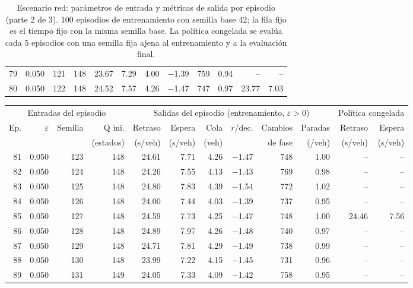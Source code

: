 \begin{table}[H]
\begin{tabular}{rrrrrrrrrrrr}
79 & 0.050 & 121 & 148 & 23.67 & 7.29 & 4.00 & $-$1.39 & 759 & 0.94 & -- & -- \\
80 & 0.050 & 122 & 148 & 24.52 & 7.57 & 4.26 & $-$1.47 & 747 & 0.97 & 23.77 & 7.03 \\
\bottomrule
\end{tabular}
\caption[Escenario red: episodios de entrenamiento (parte 2 de 3)]{Escenario red: parámetros de entrada y métricas de salida por episodio (parte 2 de 3). 100 episodios de entrenamiento con semilla base 42; la fila fijo es el tiempo fijo con la misma semilla base. La política congelada se evalúa cada 5 episodios con una semilla fija ajena al entrenamiento y a la evaluación final.}
\label{tab:red-episodios-2}
\end{table}

\begin{table}[H]
\centering
\scriptsize
\setlength{\tabcolsep}{3pt}
\begin{tabular}{rrrrrrrrrrrr}
\toprule
\multicolumn{4}{c}{Entradas del episodio} & \multicolumn{6}{c}{Salidas del episodio (entrenamiento, $\varepsilon>0$)} & \multicolumn{2}{c}{Política congelada} \\
\cmidrule(lr){1-4}\cmidrule(lr){5-10}\cmidrule(lr){11-12}
Ep. & $\varepsilon$ & Semilla & Q ini. & Retraso & Espera & Cola & $r$/dec. & Cambios & Paradas & Retraso & Espera \\
 &  &  & (estados) & (s/veh) & (s/veh) & (veh) &  & de fase & (/veh) & (s/veh) & (s/veh) \\
\midrule
81 & 0.050 & 123 & 148 & 24.61 & 7.71 & 4.26 & $-$1.47 & 748 & 1.00 & -- & -- \\
82 & 0.050 & 124 & 148 & 24.26 & 7.55 & 4.13 & $-$1.43 & 769 & 0.98 & -- & -- \\
83 & 0.050 & 125 & 148 & 24.80 & 7.83 & 4.39 & $-$1.54 & 772 & 1.02 & -- & -- \\
84 & 0.050 & 126 & 148 & 24.00 & 7.44 & 4.03 & $-$1.39 & 737 & 0.95 & -- & -- \\
85 & 0.050 & 127 & 148 & 24.59 & 7.73 & 4.25 & $-$1.47 & 748 & 1.00 & 24.46 & 7.56 \\
86 & 0.050 & 128 & 148 & 24.89 & 7.97 & 4.26 & $-$1.48 & 740 & 0.97 & -- & -- \\
87 & 0.050 & 129 & 148 & 24.71 & 7.81 & 4.29 & $-$1.49 & 738 & 0.99 & -- & -- \\
88 & 0.050 & 130 & 148 & 23.99 & 7.22 & 4.15 & $-$1.45 & 731 & 0.96 & -- & -- \\
89 & 0.050 & 131 & 149 & 24.05 & 7.33 & 4.09 & $-$1.42 & 758 & 0.95 & -- & -- \\

\end{tabular}
\end{table}
